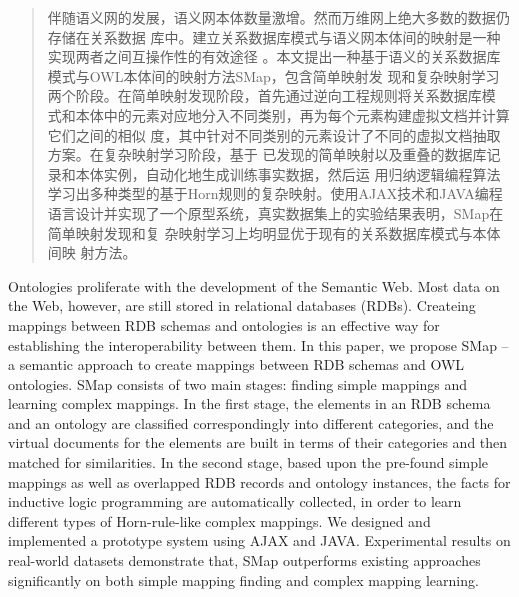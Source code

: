 \begin{abstract}
伴随语义网的发展，语义网本体数量激增。然而万维网上绝大多数的数据仍存储在关系数据
库中。建立关系数据库模式与语义网本体间的映射是一种实现两者之间互操作性的有效途径
。本文提出一种基于语义的关系数据库模式与OWL本体间的映射方法SMap，包含简单映射发
现和复杂映射学习两个阶段。在简单映射发现阶段，首先通过逆向工程规则将关系数据库模
式和本体中的元素对应地分入不同类别，再为每个元素构建虚拟文档并计算它们之间的相似
度，其中针对不同类别的元素设计了不同的虚拟文档抽取方案。在复杂映射学习阶段，基于
已发现的简单映射以及重叠的数据库记录和本体实例，自动化地生成训练事实数据，然后运
用归纳逻辑编程算法学习出多种类型的基于Horn规则的复杂映射。使用AJAX技术和JAVA编程
语言设计并实现了一个原型系统，真实数据集上的实验结果表明，SMap在简单映射发现和复
杂映射学习上均明显优于现有的关系数据库模式与本体间映
射方法。
\end{abstract}


\begin{englishabstract}
Ontologies proliferate with the development of the Semantic Web. Most data on 
the Web, however, are still stored in relational databases (RDBs). Createing
mappings between RDB schemas and ontologies is an effective way for
establishing the interoperability between them. In this paper, we propose SMap
-- a semantic approach to create mappings between RDB schemas and OWL ontologies.
SMap consists of two main stages: finding simple mappings and learning complex
mappings. In the first stage, the elements in an RDB schema and an ontology are
classified correspondingly into different categories, and the virtual documents
for the elements are built in terms of their categories and then matched for
similarities. In the second stage, based upon the pre-found simple mappings as
well as overlapped RDB records and ontology instances, the facts for inductive
logic programming are automatically collected, in order to learn different types
of Horn-rule-like complex mappings. We designed and implemented a prototype 
system using AJAX and JAVA. Experimental results on real-world datasets
demonstrate that, SMap outperforms existing approaches significantly on both
simple mapping finding and complex mapping learning. 
\end{englishabstract}

\clearpage
